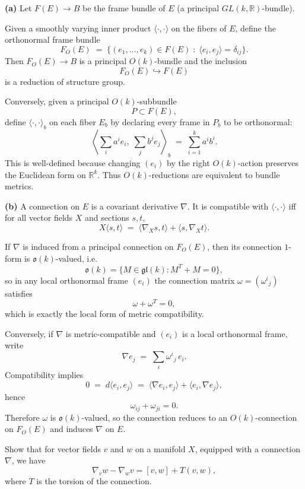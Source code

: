 \begin{solution}
\textbf{(a)}
Let $F(E)\to B$ be the frame bundle of $E$ (a principal $GL(k,\mathbb{R})$-bundle).

Given a smoothly varying inner product $\langle\cdot,\cdot\rangle$ on the fibers of $E$, define the orthonormal frame bundle
\[
F_O(E)
\;=\;
\{(e_1,\dots,e_k)\in F(E)\;:\;\langle e_i,e_j\rangle=\delta_{ij}\}.
\]
Then $F_O(E)\to B$ is a principal $O(k)$-bundle and the inclusion
\[
F_O(E)\hookrightarrow F(E)
\]
is a reduction of structure group.

Conversely, given a principal $O(k)$-subbundle
\[
P\subset F(E),
\]
define $\langle\cdot,\cdot\rangle_b$ on each fiber $E_b$ by declaring every frame in $P_b$ to be orthonormal:
\[
\left\langle \sum_i a^i e_i,\;\sum_j b^j e_j\right\rangle_b
\;=\;
\sum_{i=1}^k a^i b^i.
\]
This is well-defined because changing $(e_i)$ by the right $O(k)$-action preserves the Euclidean form on $\mathbb{R}^k$.
Thus $O(k)$-reductions are equivalent to bundle metrics.

\textbf{(b)}
A connection on $E$ is a covariant derivative $\nabla$.
It is compatible with $\langle\cdot,\cdot\rangle$ iff for all vector fields $X$ and sections $s,t$,
\[
X\langle s,t\rangle
\;=\;
\langle \nabla_X s,t\rangle+\langle s,\nabla_X t\rangle.
\]

If $\nabla$ is induced from a principal connection on $F_O(E)$, then its connection $1$-form is $\mathfrak{o}(k)$-valued, i.e.
\[
\mathfrak{o}(k)=\{M\in \mathfrak{gl}(k): M^T+M=0\},
\]
so in any local orthonormal frame $(e_i)$ the connection matrix $\omega=(\omega^i{}_j)$ satisfies
\[
\omega+\omega^T=0,
\]
which is exactly the local form of metric compatibility.

Conversely, if $\nabla$ is metric-compatible and $(e_i)$ is a local orthonormal frame, write
\[
\nabla e_j \;=\; \sum_i \omega^i{}_j\,e_i.
\]
Compatibility implies
\[
0 \;=\; d\langle e_i,e_j\rangle
\;=\;
\langle \nabla e_i,e_j\rangle+\langle e_i,\nabla e_j\rangle,
\]
hence
\[
\omega_{ij}+\omega_{ji}=0.
\]
Therefore $\omega$ is $\mathfrak{o}(k)$-valued, so the connection reduces to an $O(k)$-connection on $F_O(E)$ and induces $\nabla$ on $E$.

\end{solution}

\begin{problem}
\label{prob:cp-vii-0061}
Show that for vector fields $v$ and $w$ on a manifold $X$, equipped with a connection $\nabla$, we have
\[
\nabla_v w-\nabla_w v=[v,w]+T(v,w),
\]
where $T$ is the torsion of the connection.
\end{problem}

